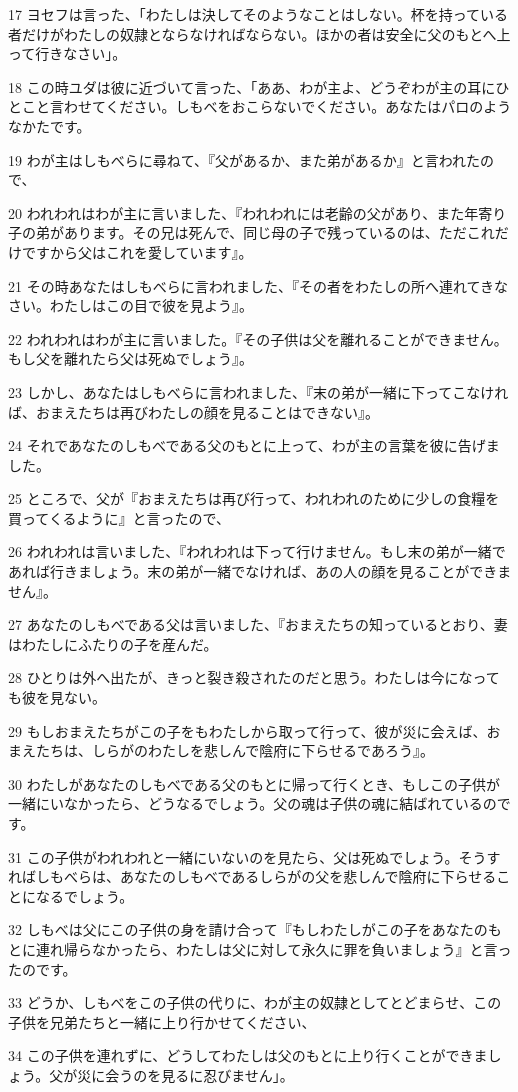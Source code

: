 \par 17 ヨセフは言った、「わたしは決してそのようなことはしない。杯を持っている者だけがわたしの奴隷とならなければならない。ほかの者は安全に父のもとへ上って行きなさい」。
\par 18 この時ユダは彼に近づいて言った、「ああ、わが主よ、どうぞわが主の耳にひとこと言わせてください。しもべをおこらないでください。あなたはパロのようなかたです。
\par 19 わが主はしもべらに尋ねて、『父があるか、また弟があるか』と言われたので、
\par 20 われわれはわが主に言いました、『われわれには老齢の父があり、また年寄り子の弟があります。その兄は死んで、同じ母の子で残っているのは、ただこれだけですから父はこれを愛しています』。
\par 21 その時あなたはしもべらに言われました、『その者をわたしの所へ連れてきなさい。わたしはこの目で彼を見よう』。
\par 22 われわれはわが主に言いました。『その子供は父を離れることができません。もし父を離れたら父は死ぬでしょう』。
\par 23 しかし、あなたはしもべらに言われました、『末の弟が一緒に下ってこなければ、おまえたちは再びわたしの顔を見ることはできない』。
\par 24 それであなたのしもべである父のもとに上って、わが主の言葉を彼に告げました。
\par 25 ところで、父が『おまえたちは再び行って、われわれのために少しの食糧を買ってくるように』と言ったので、
\par 26 われわれは言いました、『われわれは下って行けません。もし末の弟が一緒であれば行きましょう。末の弟が一緒でなければ、あの人の顔を見ることができません』。
\par 27 あなたのしもべである父は言いました、『おまえたちの知っているとおり、妻はわたしにふたりの子を産んだ。
\par 28 ひとりは外へ出たが、きっと裂き殺されたのだと思う。わたしは今になっても彼を見ない。
\par 29 もしおまえたちがこの子をもわたしから取って行って、彼が災に会えば、おまえたちは、しらがのわたしを悲しんで陰府に下らせるであろう』。
\par 30 わたしがあなたのしもべである父のもとに帰って行くとき、もしこの子供が一緒にいなかったら、どうなるでしょう。父の魂は子供の魂に結ばれているのです。
\par 31 この子供がわれわれと一緒にいないのを見たら、父は死ぬでしょう。そうすればしもべらは、あなたのしもべであるしらがの父を悲しんで陰府に下らせることになるでしょう。
\par 32 しもべは父にこの子供の身を請け合って『もしわたしがこの子をあなたのもとに連れ帰らなかったら、わたしは父に対して永久に罪を負いましょう』と言ったのです。
\par 33 どうか、しもべをこの子供の代りに、わが主の奴隷としてとどまらせ、この子供を兄弟たちと一緒に上り行かせてください、
\par 34 この子供を連れずに、どうしてわたしは父のもとに上り行くことができましょう。父が災に会うのを見るに忍びません」。

